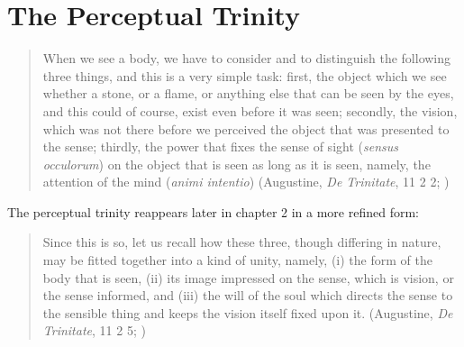 \documentclass[12pt]{article}
\begin{document}
\section{The Perceptual Trinity} %
\label{sec:the_perceptual_trinity}

\begin{quote}
	When we see a body, we have to consider and to distinguish the following three things, and this is a very simple task: first, the object which we see whether a stone, or a flame, or anything else that can be seen by the eyes, and this could of course, exist even before it was seen; secondly, the vision, which was not there before we perceived the object that was presented to the sense; thirdly, the power that fixes the sense of sight (\emph{sensus occulorum}) on the object that is seen as long as it is seen, namely, the attention of the mind (\emph{animi intentio}) (Augustine, \emph{De Trinitate}, 11 2 2; \citealt[61--62]{Matthews:2002ly})
\end{quote}

The perceptual trinity reappears later in chapter 2 in a more refined form:
\begin{quote}
	Since this is so, let us recall how these three, though differing in nature, may be fitted together into a kind of unity, namely, (i) the form of the body that is seen, (ii) its image impressed on the sense, which is vision, or the sense informed, and (iii) the will of the soul which directs the sense to the sensible thing and keeps the vision itself fixed upon it. (Augustine, \emph{De Trinitate}, 11 2 5; \citealt[65]{Matthews:2002ly})
\end{quote}





\end{document}
